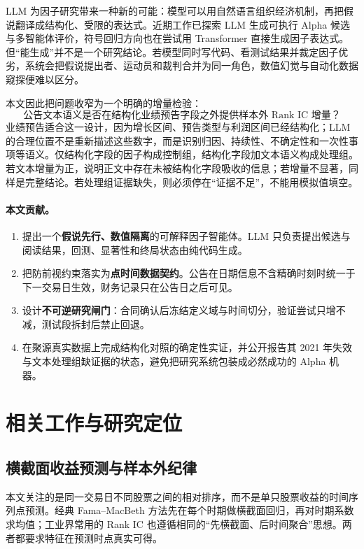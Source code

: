 \documentclass[UTF8,zihao=-4]{ctexart}
\theoremstyle{accentthm}
\begin{document}
LLM 为因子研究带来一种新的可能：模型可以用自然语言组织经济机制，再把假说翻译成结构化、受限的表达式。近期工作已探索 LLM 生成可执行 Alpha 候选与多智能体评价\cite{kou2025}，符号回归方向也在尝试用 Transformer 直接生成因子表达式\cite{alphaformer2026}。但“能生成”并不是一个研究结论。若模型同时写代码、看测试结果并裁定因子优劣，系统会把假说提出者、运动员和裁判合并为同一角色，数值幻觉与自动化数据窥探便难以区分。

本文因此把问题收窄为一个明确的增量检验：
\[
  \text{公告文本语义是否在结构化业绩预告字段之外提供样本外 Rank IC 增量？}
\]
业绩预告适合这一设计，因为增长区间、预告类型与利润区间已经结构化；LLM 的合理位置不是重新描述这些数字，而是识别归因、持续性、不确定性和一次性事项等语义。仅结构化字段的因子构成控制组，结构化字段加文本语义构成处理组。若文本增量为正，说明正文中存在未被结构化字段吸收的信息；若增量不显著，同样是完整结论。若处理组证据缺失，则必须停在“证据不足”，不能用模拟值填空。

\paragraph{本文贡献。}
\begin{enumerate}[leftmargin=2.2em,itemsep=2pt,topsep=2pt]
  \item 提出一个\textbf{假说先行、数值隔离}的可解释因子智能体。LLM 只负责提出候选与阅读结果，回测、显著性和终局状态由纯代码生成。
  \item 把防前视约束落实为\textbf{点时间数据契约}。公告在日期信息不含精确时刻时统一于下一交易日生效，财务记录只在公告日之后可见。
  \item 设计\textbf{不可逆研究闸门}：合同确认后冻结定义域与时间切分，验证尝试只增不减，测试段拆封后禁止回退。
  \item 在聚源真实数据上完成结构化对照的确定性实证，并公开报告其 2021 年失效与文本处理组缺证据的状态，避免把研究系统包装成必然成功的 Alpha 机器。
\end{enumerate}

\section{相关工作与研究定位}

\subsection{横截面收益预测与样本外纪律}

本文关注的是同一交易日不同股票之间的相对排序，而不是单只股票收益的时间序列点预测。经典 Fama--MacBeth 方法先在每个时期做横截面回归，再对时期系数求均值\cite{fama1973}；工业界常用的 Rank IC 也遵循相同的“先横截面、后时间聚合”思想。两者都要求特征在预测时点真实可得。
\end{document}
